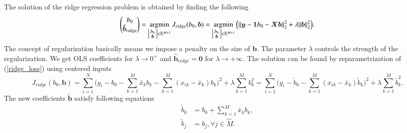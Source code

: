 \documentclass[11pt,oneside,czech,american]{book} %
\theoremstyle{definition} %
\theoremstyle{definition}
\DeclareMathOperator*{\argmin}{argmin} %
\begin{document}
The solution of the ridge regression problem is obtained by finding the following
\begin{equation}
	\begin{pmatrix}
		b_0 \\
		\bm{\hat{b}}_{ridge}
	\end{pmatrix} = \argmin_{
	\begin{bsmallmatrix}
		b_0 \\
		\bm{b}
	\end{bsmallmatrix} \in \mathbb{R}^{M+1}} J_{ridge}(b_0, \bm{b}) = \argmin_{	\begin{bsmallmatrix}
	b_0 \\
	\bm{b}
\end{bsmallmatrix} \in \mathbb{R}^{M+1}} \Big( \lVert \bm{y} - \bm{1} b_0 -\bm{X}\bm{b}\rVert_{2}^2 + \lambda \lVert \bm{b} \rVert^2_{2} \Big). \label{ridge_regression}
\end{equation}
The concept of regularization basically means we impose a penalty on the size of $\bm{b}$. The parameter $\lambda$ controls the strength of the regularization. We get OLS coefficients for $\lambda \rightarrow 0^{+}$ and $\bm{\hat{b}}_{ridge}=\bm{0}$ for $\lambda \rightarrow +\infty$. The solution can be found by reparametrization of (\ref{ridge_loss}) using centered inputs
\begin{equation}
	J_{ridge}(b_0, \bm{b}) = \sum_{i=1}^{N} \Big(y_i - b_0 - \sum_{k=1}^{M} \bar{x}_k b_k - \sum_{k=1}^{M} (x_{ik} - \bar{x}_k) b_k \Big)^2 + \lambda \sum_{k=1}^{M} b^{2}_k = \sum_{i=1}^{N} \Big(y_i - \tilde{b}_0 - \sum_{k=1}^{M} (x_{ik} - \bar{x}_k) \tilde{b}_k \Big)^2 + \lambda \sum_{k=1}^{M} \tilde{b}^{2}_k.
\end{equation}
The new coefficients $\bm{\tilde{b}}$ satisfy following equations
\begin{equation}
\begin{aligned}
	\tilde{b}_0 &= b_0 + \sum_{k=1}^{M} \bar{x}_k b_k, \\
	\tilde{b}_j &= b_j, \forall j \in \hat{M}.
\end{aligned}
\label{tilde_coefficients}
\end{equation}
\end{document}
